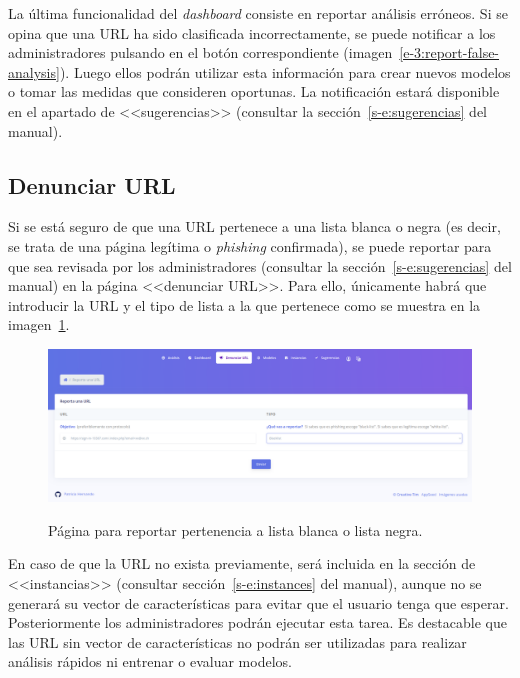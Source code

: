 \label{s-e:report-false-analy}
La última funcionalidad del \textit{dashboard} consiste en reportar análisis erróneos. Si se opina que una URL ha sido clasificada incorrectamente, se puede notificar a los administradores pulsando en el botón correspondiente (imagen~\ref{e-3:report-false-analysis}). Luego ellos podrán utilizar esta información para crear nuevos modelos o tomar las medidas que consideren oportunas. La notificación estará disponible en el apartado de <<sugerencias>> (consultar la sección~\ref{s-e:sugerencias} del manual).

\subsection{Denunciar URL}
\label{s-e:report-url}

Si se está seguro de que una URL pertenece a una lista blanca o negra (es decir, se trata de una página legítima o \textit{phishing} confirmada), se puede reportar para que sea revisada por los administradores (consultar la sección~\ref{s-e:sugerencias} del manual) en la página <<denunciar URL>>. Para ello, únicamente habrá que introducir la URL y el tipo de lista a la que pertenece como se muestra en la imagen~\ref{e-3:report-url}.

\begin{figure}[h]
	\caption[Manual de usuario: reportar pertenencia a lista]{Página para reportar pertenencia a lista blanca o lista negra.}
	\centering
	\includegraphics[width=\textwidth]{../img/anexos/user_guide/4_report_url}
	\label{e-3:report-url}
\end{figure}

En caso de que la URL no exista previamente, será incluida en la sección de <<instancias>> (consultar sección~\ref{s-e:instances} del manual), aunque no se generará su vector de características para evitar que el usuario tenga que esperar. Posteriormente los administradores podrán ejecutar esta tarea. Es destacable que las URL sin vector de características no podrán ser utilizadas para realizar análisis rápidos ni entrenar o evaluar modelos.


